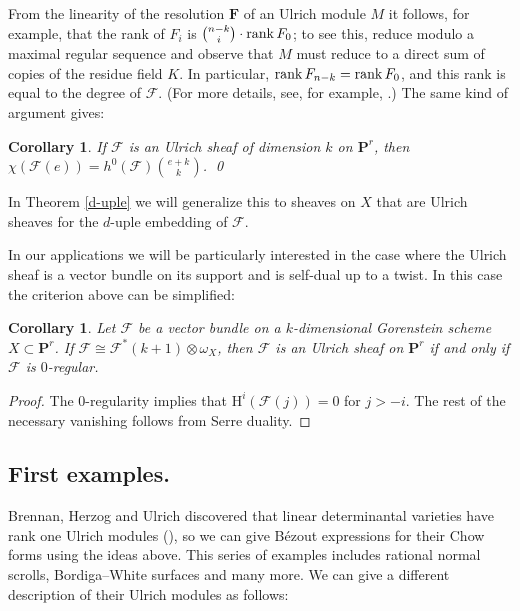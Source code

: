 \documentclass{jams-l}
\newtheorem{corollary}[theorem]{Corollary}
\theoremstyle{definition}
\theoremstyle{remark}
\newcommand{\F}{{\mathcal F}}
\newcommand{\FF}{{\mathbf F}}
\newcommand{\Hrm}{{\mathrm H}}
\newcommand{\PP}{{\mathbf P}}
\newcommand{\rank}{\mathop{\rm rank}}
\newcommand{\iso}{\cong}
\begin{document}
From the linearity of the resolution $\FF$ of an Ulrich module 
$M$ it follows, for
example, that the rank of
$F_{i}$ is ${n-k\choose i}\cdot\rank F_0$; to see this,
reduce modulo a maximal
regular sequence and observe that $M$ must reduce to a direct
sum of copies of the residue field $K$. In particular,
$\rank F_{n-k}=\rank F_0$, and this rank is
equal to the degree of $\F$. (For more details, see, for example,
\cite{Brennanetal.1987}.) The same kind of argument gives:

\begin{corollary}\label{coho of Ulrich} 
If $\F$ is an Ulrich sheaf of dimension
$k$ on $\PP^r$, then 
$\chi(\F(e))=h^0(\F){e+k\choose k}$.
\qed
\end{corollary}

In Theorem \ref{d-uple} 
we will generalize this to
sheaves on $X$ that are Ulrich sheaves for the $d$-uple embedding
of $\F$.

In our applications we will be particularly interested in the
case where the Ulrich sheaf is a vector bundle on its support
and is
self-dual up to a twist. In this case the criterion above
can be simplified:

\begin{corollary}\label{self-dual Ulrich}
Let $\F$ be a vector bundle on a $k$-dimensional Gorenstein scheme
$X\subset \PP^r$. If $\F\iso \F^*(k+1)\otimes \omega_X$, then
$\F$ is an Ulrich sheaf on $\PP^r$ if and only if $\F$ is $0$-regular.
\end{corollary}

\begin{proof} The 0-regularity implies that $\Hrm^i(\F(j))=0$ for
$j>-i$. The rest of the necessary vanishing follows from Serre duality.
\end{proof}

\subsection*{First examples.}

Brennan, Herzog and Ulrich discovered  that 
linear determinantal varieties have rank one Ulrich modules
(\cite{Brennanetal.1987}),
so we can
give B\'ezout expressions for their Chow forms using the ideas
above. This series of examples includes rational normal scrolls,
Bordiga--White surfaces and many more.
We can give a different description of their
Ulrich modules as follows:
\end{document}
